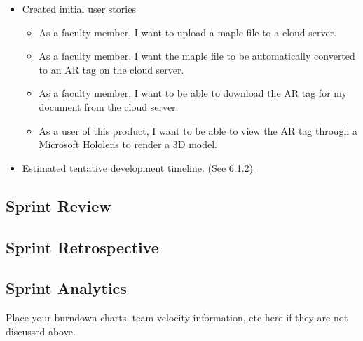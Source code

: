         \begin{itemize} 
            \item Created initial user stories 
            \begin{itemize}
                \item As a faculty member, I want to upload a maple file to a cloud server.

                \item As a faculty member, I want the maple file to be automatically converted to an AR tag on the 
                cloud server.

                \item As a faculty member, I want to be able to download the AR tag for my document from the cloud 
                server.

                \item As a user of this product, I want to be able to view the AR tag through a Microsoft Hololens 
                to render a 3D model.
            \end{itemize}
        \end{itemize}

        \begin{itemize} \item Estimated tentative development timeline. \hyperref[itm:Sprint0-Timeline]{(See 6.1.2)} \end{itemize}

\subsection{Sprint Review}
\subsection{Sprint Retrospective}
\subsection{Sprint Analytics} 
Place your burndown charts, team velocity information, etc here if they are not discussed above.